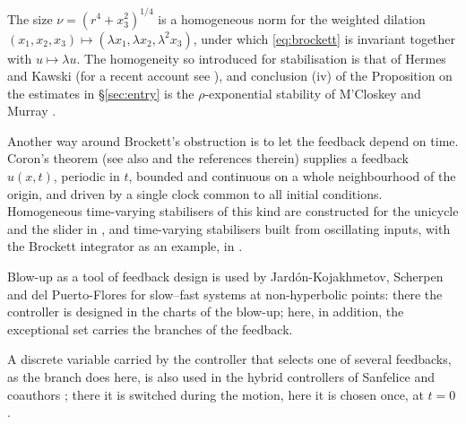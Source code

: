 \documentclass[11pt,reqno]{amsart}
\theoremstyle{plain}
\theoremstyle{definition}
\theoremstyle{remark}
\begin{document}
The size $\nu=(r^{4}+x_3^{2})^{1/4}$ is a homogeneous norm for the weighted dilation
$(x_1,x_2,x_3)\mapsto(\lambda x_1,\lambda x_2,\lambda^{2}x_3)$, under which
\eqref{eq:brockett} is invariant together with $u\mapsto\lambda u$. The homogeneity so
introduced for stabilisation is that of Hermes
\cite{Hermes1991} and Kawski \cite{Kawski1990} (for a recent account see \cite{Polyakov2020}), and conclusion (iv) of the Proposition on the estimates in
\S\ref{sec:entry} is the $\rho$-exponential stability of M'Closkey and Murray
\cite{MCloskeyMurray1997}.

Another way around Brockett's obstruction is to let the feedback depend on time. Coron's
theorem \cite{Coron1992} (see also \cite{Coron2007} and the references therein)
supplies a feedback $u(x,t)$, periodic in $t$, bounded and continuous on a whole
neighbourhood of the origin, and driven by a single clock common to all initial conditions.
Homogeneous time-varying stabilisers of this kind are constructed for the unicycle and the slider in
\cite{dAndreaNovelCoronPerruquetti2020}, and time-varying stabilisers built from oscillating inputs,
with the Brockett integrator as an example, in \cite{Zuyev2016,ZuyevGrushkovskaya2025}.

Blow-up as a tool
of feedback design is used by Jard\'on-Kojakhmetov, Scherpen and del Puerto-Flores \cite{JardonScherpenPuerto2019}
for slow--fast systems at non-hyperbolic points: there the controller is designed in the charts of the
blow-up; here, in addition, the exceptional set carries the branches of the feedback.

A discrete variable
carried by the controller that selects one of several feedbacks, as the branch does here, is also used in
the hybrid controllers of Sanfelice and coauthors \cite{GoebelSanfeliceTeel2012,Sanfelice2021}; there it is
switched during the motion, here it is chosen once, at $t=0$.
\end{document}
